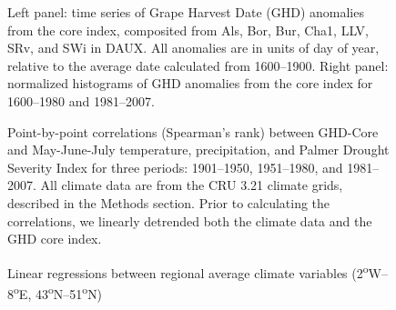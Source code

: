 \documentclass{nature}
\begin{document}
\begin{figure}
\caption{Left panel: time series of Grape Harvest Date (GHD) anomalies from the core index, composited from Als, Bor, Bur, Cha1, LLV, SRv, and SWi in DAUX. All anomalies are in units of day of year, relative to the average date calculated from 1600--1900. Right panel: normalized histograms of GHD anomalies from the core index for 1600--1980 and 1981--2007.}
\end{figure}

\begin{figure}
\caption{Point-by-point correlations (Spearman's rank) between GHD-Core and May-June-July temperature, precipitation, and Palmer Drought Severity Index for three periods: 1901--1950, 1951--1980, and 1981--2007. All climate data are from the CRU 3.21 climate grids, described in the Methods section. Prior to calculating the correlations, we linearly detrended both the climate data and the GHD core index.}
\end{figure}

\begin{figure}
\caption{Linear regressions between regional average climate variables (2\textsuperscript{o}W--8\textsuperscript{o}E, 43\textsuperscript{o}N--51\textsuperscript{o}N)}
\end{figure}


\end{document}
